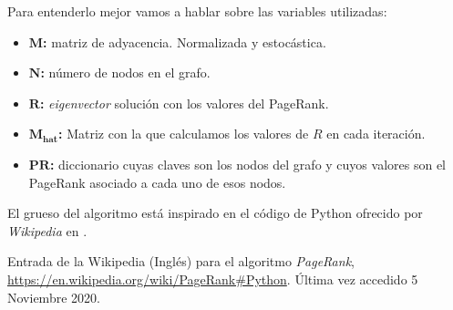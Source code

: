 \documentclass[11pt]{article}
\begin{document}
Para entenderlo mejor vamos a hablar sobre las variables utilizadas:
\begin{itemize}
    \item \textbf{$\boldsymbol{M}$:} matriz de adyacencia. Normalizada y estocástica.
    \item \textbf{$\boldsymbol{N}$:} número de nodos en el grafo.
    \item \textbf{$\boldsymbol{R}$:} \textit{eigenvector} solución con los valores del PageRank.
    \item \textbf{$\boldsymbol{M_{hat}}$:} Matriz con la que calculamos los valores de $R$ en cada iteración.
    \item \textbf{$\boldsymbol{PR}$:} diccionario cuyas claves son los nodos del grafo y cuyos valores son el PageRank asociado a cada uno de esos nodos.
\end{itemize}

El grueso del algoritmo está inspirado en el código de Python ofrecido por \textit{Wikipedia} en \cite{codewikipedia}.
\begin{thebibliography}{8}
Entrada de la Wikipedia (Inglés) para el algoritmo \textit{PageRank}, \url{https://en.wikipedia.org/wiki/PageRank#Python}. Última vez accedido 5 Noviembre 2020.
\end{thebibliography}
\end{document}
